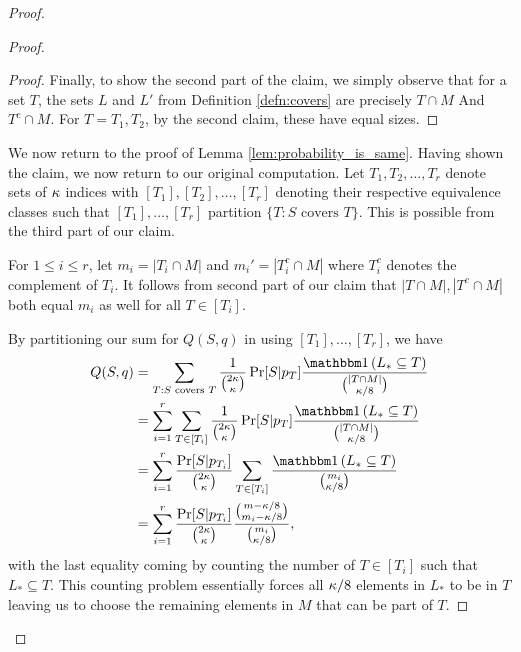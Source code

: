 \begin{proof}
\begin{proof}
\begin{proof}
Finally, to show the second part of the claim, we simply observe that for a set $T$, the sets $L$ and $L'$ from Definition \ref{defn:covers} are precisely $T \cap M$ And $T^c \cap M$. For $T = T_1, T_2$, by the second claim, these have equal sizes.
\end{proof}

We now return to the proof of Lemma \ref{lem:probability_is_same}. Having shown the claim, we now return to our original computation. Let $T_1, T_2, \dots, T_r$ denote sets of $\kappa$ indices with $[T_1], [T_2], \dots, [T_r]$ denoting their respective equivalence classes such that $[T_1], \dots, [T_r]$ partition $\{T: S\text{ covers }T\}$. This is possible from the third part of our claim.

For $1 \leq i \leq r$, let $m_i = |T_i \cap M|$ and $m_i' = |T_i^c \cap M|$ where $T_i^c$ denotes the complement of $T_i$. It follows from second part of our claim that $|T \cap M|, |T^c \cap M|$ both equal $m_i$ as well for all $T \in [T_i]$. 

By partitioning our sum for $Q(S, q)$ in using $[T_1], \dots, [T_r]$, we have
\begin{equation*}
\begin{split}
Q(S, q) &= \sum_{T: S\text{ covers }T} \frac{1}{\binom{2\a}{\a}}\Pr[S|p_T]\frac{\ind\left(L_* \subseteq T\right)}{\binom{|T \cap M|}{\a/8}} \\
&= \sum_{i = 1}^r \sum_{T \in [T_i]} \frac{1}{\binom{2\a}{\a}}\Pr[S|p_T]\frac{\ind\left(L_* \subseteq T\right)}{\binom{|T \cap M|}{\a/8}} \\
&= \sum_{i = 1}^r \frac{\Pr[S|p_{T_i}]}{\binom{2\a}{\a}}\sum_{T \in [T_i]} \frac{\ind\left(L_* \subseteq T\right)}{\binom{m_i}{\a/8}}  \\
&= \sum_{i = 1}^r \frac{\Pr[S|p_{T_i}]}{\binom{2\a}{\a}}\frac{\binom{m - \a/8}{m_i - \a/8}}{\binom{m_i}{\a/8}},
\end{split}
\end{equation*}
with the last equality coming by counting the number of $T \in [T_i]$ such that $L_* \subseteq T$. This counting problem essentially forces all $\kappa/8$ elements in $L_*$ to be in $T$ leaving us to choose the remaining elements in $M$ that can be part of $T$.


\end{proof}
\end{proof}
